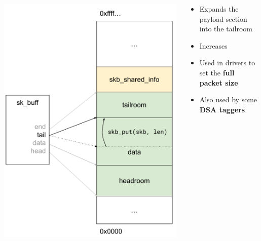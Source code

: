 \begin{frame}{}
	\begin{columns}
		\begin{column}{0.4\textwidth}
			\includegraphics[width=\textwidth]{slides/networking-skb/skb_put.pdf}
		\end{column}
		\begin{column}{0.6\textwidth}
			\begin{itemize}
				\item Expands the payload section into the tailroom
				\item Increases 
				\item Used in drivers to set the \textbf{full packet size}
				\item Also used by some \textbf{DSA taggers}
			\end{itemize}
		\end{column}
	\end{columns}
\end{frame}

